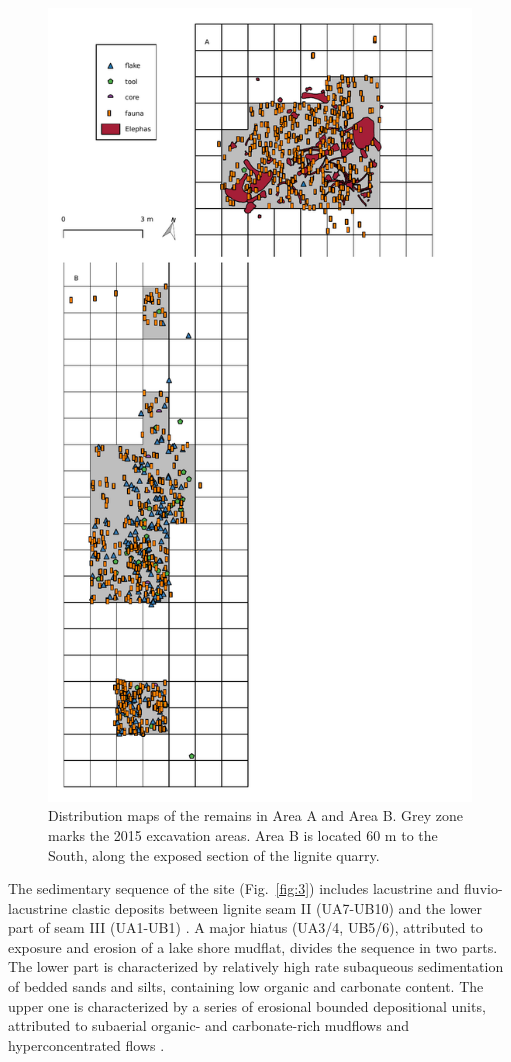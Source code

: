 \documentclass[preprint,authoryear,times]{elsarticle} %
\begin{document}
\begin{figure}[]
  \centering
  \includegraphics[width=.8\textwidth]{../artwork/Fig2.pdf}
  \caption{Distribution maps of the remains in Area A and Area B. Grey zone marks the 2015 excavation areas. Area B is located 60 m to the South, along the exposed section of the lignite quarry.}
  \label{fig:2}
\end{figure}

The sedimentary sequence of the site (Fig.~\ref{fig:3}) includes lacustrine and fluvio-lacustrine clastic deposits between lignite seam II (UA7-UB10) and the lower part of seam III (UA1-UB1) \citep{Karkanas,Tourloukis}. A major hiatus (UA3/4, UB5/6), attributed to exposure and erosion of a lake shore mudflat, divides the sequence in two parts. The lower part is characterized by relatively high rate subaqueous sedimentation of bedded sands and silts, containing low organic and carbonate content. The upper one is characterized by a series of erosional bounded depositional units, attributed to subaerial organic- and carbonate-rich mudflows and hyperconcentrated flows \citep{Karkanas}.
\end{document}
